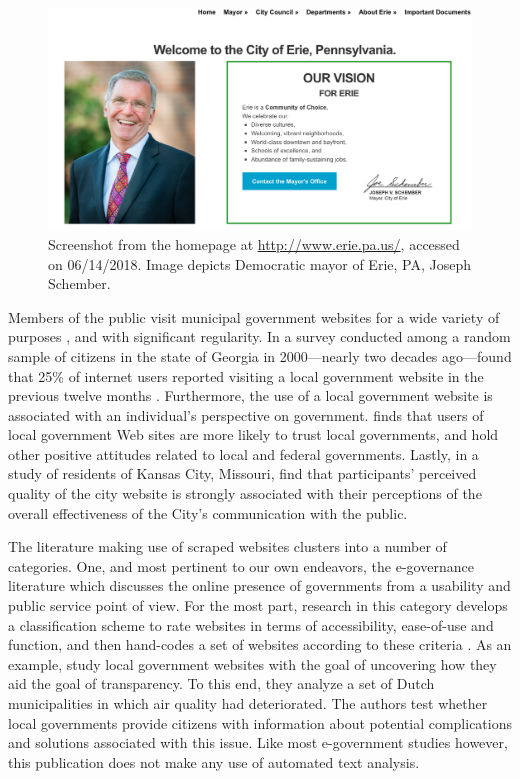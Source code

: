 \documentclass[11pt]{article}
\begin{document}
\begin{figure}
\centering
\includegraphics[scale=0.35]{figures/eriemayor}
\caption{Screenshot from the homepage at \url{http://www.erie.pa.us/}, accessed on 06/14/2018. Image depicts  Democratic mayor of Erie, PA, Joseph Schember.}
\label{fig:eriemayor}
\end{figure}



Members of the public visit municipal government websites for a wide variety of purposes \citet{sandoval2012government}, and with significant regularity. In a survey conducted among a random sample of citizens in the state of Georgia in 2000---nearly two decades ago---found that 25\% of internet users reported visiting a local government website in the previous twelve months \citep{thomas2003new}. Furthermore, the use of a local government website is associated with an individual's perspective on government. \citet{tolbert2006effects} finds that users of local government Web sites are more likely to trust local governments, and hold other positive attitudes related to local and federal governments. Lastly, in a study of residents of Kansas City, Missouri, \citet{ho2017government} find that participants' perceived quality of the city website is strongly associated with their perceptions of the overall effectiveness of the City's communication with the public.


The literature making use of scraped websites clusters into a number of categories. One, and most pertinent to our own endeavors, the e-governance literature which discusses the online presence of governments from a usability and public service point of view. For the most part, research in this category develops a classification scheme to rate websites in terms of accessibility, ease-of-use and function, and then hand-codes a set of websites according to these criteria \citep{Urban2002,Armstrong2011,Feeney2017}. As an example, \cite{grimmelikhuijsen2012developing} study local government websites with the goal of uncovering how they aid the goal of transparency. To this end, they analyze a set of Dutch municipalities in which air quality had deteriorated. The authors test whether local governments provide citizens with information about potential complications and solutions associated with this issue. Like most e-government studies however, this publication does not make any use of automated text analysis.
\end{document}
